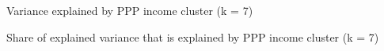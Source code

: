 \documentclass[aspectratio=169,xcolor=dvipsnames, 11pt,mathserif]{beamer}
\begin{document}
\begin{frame}{Variance explained by PPP income cluster (k = 7) \label{gdp_add}\hyperlink{gdp}{}}
    
\end{frame}

\begin{frame}{Share of explained variance that is explained by PPP income cluster (k = 7)\label{share_gdp_add}\hyperlink{share_gdp}{}} %
    
\end{frame}
\end{document}
